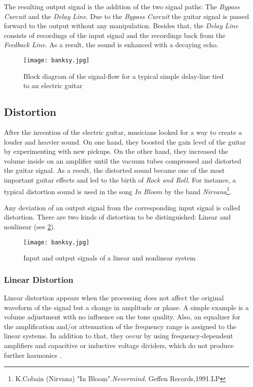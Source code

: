 The resulting output signal is the addition of the two signal paths: The \textit{Bypass Curcuit} and the \textit{Delay Line}.
Due to the \textit{Bypass Curcuit} the guitar signal is passed forward to the output without any manipulation. Besides that, the \textit{Delay Line} consists of recordings of the input signal and the recordings back from the \textit{Feedback Line}. As a result, the sound is enhanced with a decaying echo.




\begin{figure}[H]
	\centering \texttt{[image: banksy.jpg]}
	\caption[DelaySimple]{Block diagram of the signal-flow for a typical simple delay-line tied to an electric guitar\,\cite[p.\,124]{Hodgson:2010}}
	\label{fig:DelaySimple}
\end{figure}

\subsection{Distortion}

After the invention of the electric guitar, musicians looked for a way to create a louder and heavier sound. On one hand, they boosted the gain level of the guitar by experimenting with new pickups. On the other hand, they increased the volume inside on an amplifier until the vacuum tubes compressed and distorted the guitar signal. As a result, the distorted sound became one of the most important guitar effects and led to the birth of \textit{Rock and Roll}.
For instance, a typical distortion sound is used in the song \textit{In Bloom} by the band \textit{Nirvana}\footnote{K.Cobain (Nirvana) "In Bloom".\textit{Nevermind}. Geffen Records,1991.LP }.

Any deviation of an output signal from the corresponding input signal is called distortion.
There are two kinds of distortion to be distinguished: Linear and nonlinear (see \ref{fig:nonlinearScheme}).

\begin{figure}[H]
	\centering \texttt{[image: banksy.jpg]}
	\caption[nonlinearScheme]{Input and output signals of a linear and nonlinear system \cite[p.\,94]{Zolzer:2002}}
	\label{fig:nonlinearScheme}
\end{figure}


\subsubsection{Linear Distortion}
Linear distortion appears when the processing does not affect the original waveform of the signal but a change in amplitude or phase. A simple example is a volume adjustment with no influence on the tone quality. Also, an equalizer for the amplification and/or attenuation of the frequency range is assigned to the linear systems. In addition to that, they occur by using frequency-dependent amplifiers and capacitive or inductive voltage dividers, which do not produce further harmonics \cite{Sengpiel:2007}.

